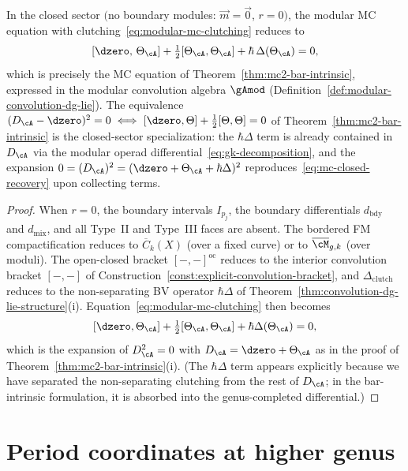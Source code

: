 \begin{corollary}
\label{cor:recovery-bar-intrinsic}
In the closed sector $($no boundary modules:
$\vec{m} = \vec{0}$, $r = 0)$, the modular MC equation with
clutching~\eqref{eq:modular-mc-clutching} reduces to
\begin{equation}\label{eq:mc-closed-recovery}
[\dzero,\, \Theta_\cA]
+ \tfrac{1}{2}[\Theta_\cA, \Theta_\cA]
+ \hbar\,\Delta(\Theta_\cA) = 0,
\end{equation}
which is precisely the MC equation of
Theorem~\textup{\ref{thm:mc2-bar-intrinsic}}, expressed in the
modular convolution algebra
$\gAmod$
\textup{(}Definition~\textup{\ref{def:modular-convolution-dg-lie})}.
The equivalence $(D_\cA - \dzero)^2 = 0 \iff
[\dzero, \Theta] + \frac{1}{2}[\Theta, \Theta] = 0$ of
Theorem~\textup{\ref{thm:mc2-bar-intrinsic}} is the closed-sector
specialization: the $\hbar\Delta$ term is already contained in
$D_\cA$ via the modular operad differential~\eqref{eq:gk-decomposition},
and the expansion
$0 = (D_\cA)^2 = (\dzero + \Theta_\cA + \hbar\Delta)^2$
reproduces~\eqref{eq:mc-closed-recovery} upon collecting terms.
\end{corollary}

\begin{proof}
When $r = 0$, the boundary intervals $I_{p_j}$, the
boundary differentials $d_{\mathrm{bdy}}$ and $d_{\mathrm{mix}}$,
and all Type~II and Type~III faces are absent. The bordered FM
compactification reduces to $\overline{C}_k(X)$ (over a fixed
curve) or to $\overline{\cM}_{g,k}$ (over moduli). The
open-closed bracket $[-,-]^{\mathrm{oc}}$ reduces to the
interior convolution bracket $[-,-]$ of
Construction~\ref{const:explicit-convolution-bracket}, and
$\Delta_{\mathrm{clutch}}$ reduces to the non-separating BV
operator $\hbar\Delta$ of
Theorem~\ref{thm:convolution-dg-lie-structure}(i).
Equation~\eqref{eq:modular-mc-clutching} then becomes
\[
[\dzero, \Theta_\cA]
+ \tfrac{1}{2}[\Theta_\cA, \Theta_\cA]
+ \hbar\Delta(\Theta_\cA) = 0,
\]
which is the expansion of $D_\cA^2 = 0$ with
$D_\cA = \dzero + \Theta_\cA$ as in the proof of
Theorem~\ref{thm:mc2-bar-intrinsic}(i). (The $\hbar\Delta$
term appears explicitly because we have separated the
non-separating clutching from the rest of $D_\cA$; in the
bar-intrinsic formulation, it is absorbed into the
genus-completed differential.)
\end{proof}


\section{Period coordinates at higher genus}

